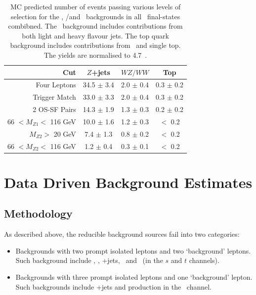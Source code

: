 \begin{table}[htbp]
  \centering
  \begin{tabular}{r|c|c|c} 
    \hline\hline
                 Cut &               $Z$+jets &             $WZ/WW$ &               Top\\ 
    \hline
        Four Leptons        &  34.5 $\pm$ 3.4 & 2.0 $\pm$ 0.4 & 0.3 $\pm$ 0.2 \\ 
       Trigger Match        &  33.0 $\pm$ 3.3 & 2.0 $\pm$ 0.4 & 0.3 $\pm$ 0.2 \\ 
       2 OS-SF Pairs        &  14.3 $\pm$ 1.9 & 1.3 $\pm$ 0.3 & 0.2 $\pm$ 0.2 \\ 
66 $ < M_{Z1} < $ 116 GeV   &  10.0 $\pm$ 1.6 & 1.2 $\pm$ 0.3 & $<$ 0.2 \\ 
  $M_{Z2} > $ 20 GeV        &  7.4  $\pm$ 1.3 & 0.8 $\pm$ 0.2 & $<$ 0.2 \\ 
66 $ < M_{Z2} < $ 116 GeV   &  1.2  $\pm$ 0.4 & 0.3 $\pm$ 0.1 & $<$ 0.2 \\ 
    \hline\hline
  \end{tabular}
  \caption[MC predicted number of events passing various levels of selection for
  the \Zjets, \WZ/\WW and \topquark\ backgrounds in all \llll\ final-states
  combined.]
  {MC predicted number of events passing various levels of selection for
  the \Zjets, \WZ/\WW and \topquark\ backgrounds in all \llll\ final-states
  combibned. The
  \Zjets\ background includes contributions from both light and heavy flavour
  jets. The top quark background includes contributions from \ttbar\ and
  single top. The yields are normalised to 4.7~\ifb.
  }
  \label{table:mc-bg-4l}
\end{table}

\section{Data Driven Background Estimates}
\label{sec:ddbg}

\subsection{Methodology}

As described above, the reducible background sources fail into two categories:

\begin{itemize}
\item Backgrounds with two prompt isolated leptons and two `background' leptons. Such
background include \Zjets, \Zgamma, \WW+jets, \ttbar\ and \singletop\ (in the
$s$ and $t$ channels).
\item Backgrounds with three prompt isolated leptons and one `background'
lepton. Such backgrounds include \WZ+jets and \singletop production in the \Wt\
channel.
\end{itemize}

